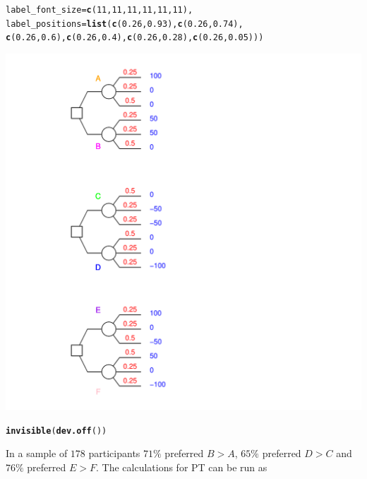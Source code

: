 \documentclass{article}\usepackage[]{graphicx}\usepackage[]{color}
\makeatletter
\newcommand{\hlnum}[1]{\textcolor[rgb]{0.686,0.059,0.569}{#1}}%
\newcommand{\hlstd}[1]{\textcolor[rgb]{0.345,0.345,0.345}{#1}}%
\newcommand{\hlkwc}[1]{\textcolor[rgb]{0.333,0.667,0.333}{#1}}%
\newcommand{\hlkwd}[1]{\textcolor[rgb]{0.737,0.353,0.396}{\textbf{#1}}}%
\newenvironment{kframe}{%
 \def\at@end@of@kframe{}%
 \ifinner\ifhmode%
  \def\at@end@of@kframe{\end{minipage}}%
  \begin{minipage}{\columnwidth}%
 \fi\fi%
 \def\FrameCommand##1{\hskip\@totalleftmargin \hskip-\fboxsep
 \colorbox{shadecolor}{##1}\hskip-\fboxsep
     \hskip-\linewidth \hskip-\@totalleftmargin \hskip\columnwidth}%
 \MakeFramed {\advance\hsize-\width
   \@totalleftmargin\z@ \linewidth\hsize
   \@setminipage}}%
 {\par\unskip\endMakeFramed%
 \at@end@of@kframe}
\newenvironment{knitrout}{}{} %
\makeatother
\begin{document}
\begin{knitrout}
\begin{kframe}
\begin{alltt}
        \hlkwc{label_font_size}\hlstd{=}\hlkwd{c}\hlstd{(}\hlnum{11}\hlstd{,}\hlnum{11}\hlstd{,}\hlnum{11}\hlstd{,}\hlnum{11}\hlstd{,}\hlnum{11}\hlstd{,}\hlnum{11}\hlstd{),}
        \hlkwc{label_positions}\hlstd{=}\hlkwd{list}\hlstd{(}\hlkwd{c}\hlstd{(}\hlnum{0.26}\hlstd{,}\hlnum{0.93}\hlstd{),}\hlkwd{c}\hlstd{(}\hlnum{0.26}\hlstd{,}\hlnum{0.74}\hlstd{),}
                \hlkwd{c}\hlstd{(}\hlnum{0.26}\hlstd{,}\hlnum{0.6}\hlstd{),}\hlkwd{c}\hlstd{(}\hlnum{0.26}\hlstd{,}\hlnum{0.4}\hlstd{),}\hlkwd{c}\hlstd{(}\hlnum{0.26}\hlstd{,}\hlnum{0.28}\hlstd{),}\hlkwd{c}\hlstd{(}\hlnum{0.26}\hlstd{,}\hlnum{0.05}\hlstd{)))}
\end{alltt}
\end{kframe}

{\centering \includegraphics[width=0.8\linewidth]{figure/unnamed-chunk-37} 

}


\begin{kframe}\begin{alltt}
\hlkwd{invisible}\hlstd{(}\hlkwd{dev.off}\hlstd{())}
\end{alltt}
\end{kframe}
\end{knitrout}


In a sample of $178$ participants $71\%$ preferred $B > A$, $65\%$ preferred $D > C$ and $76\%$ preferred $E > F$. The calculations for PT can be run as
\end{document}
